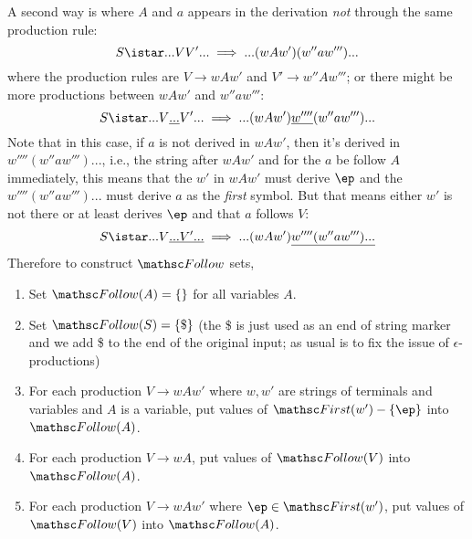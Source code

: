 A second way is where $A$ and $a$ appears in the derivation \textit{not} through
the same production rule:
\[
S \istar ... V V' ... \implies ... (wAw')(w'' a w''') ...
\]
where the production rules are $V \rightarrow wAw'$ and
$V' \rightarrow w''Aw'''$; or there might be more productions between
$wAw'$ and $w''aw'''$:
\[
S \istar ... V \underline{...} V' ... \implies ... (wAw') \underline{w''''} (w'' a w''') ...
\]
Note that in this case, if $a$ is not derived in $wAw'$,
then it's derived in $w'''' (w'' a w''') ...$, i.e., the string after $wAw'$
and for the $a$ be follow $A$ immediately, this means that
the $w'$ in $wAw'$ must derive $\ep$ and the $w'''' (w'' a w''') ...$
must derive $a$ as the \textit{first} symbol. 
But that means either $w'$ is not there or at least derives $\ep$
and that $a$ follows $V$:
\[
S \istar ... V \underline{... V' ...} \implies ... (wAw') \underline{w'''' (w'' a w''') ...}
\]
Therefore to construct $\FOLLOW$ sets,
\begin{enumerate}[nosep]
\item Set $\FOLLOW(A) = \{\}$ for all variables $A$.
\item Set $\FOLLOW(S) = \{ \$ \} $
  (the \$ is just used as an end of string marker and we add \$ to the
  end of the original input; 
  as usual is to fix the issue of $\epsilon$-productions)
\item For each production $V \rightarrow wAw'$ where $w,w'$ are strings of
  terminals and variables
  and $A$ is a variable, put values of $\FIRST(w') - \{\ep\}$ into $\FOLLOW(A)$.
\item For each production $V \rightarrow wA$, put values of $\FOLLOW(V)$ into $\FOLLOW(A)$.
\item For each production $V \rightarrow wAw'$ where $\ep \in \FIRST(w')$,
  put values of $\FOLLOW(V)$ into $\FOLLOW(A)$.
\end{enumerate}

